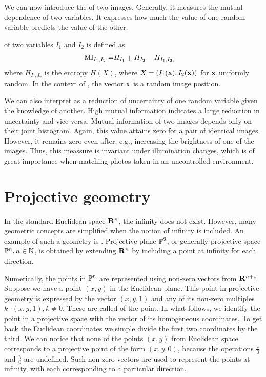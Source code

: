 We can now introduce the  of two images. 
Generally, it measures the mutual dependence of two variables. 
It expresses how much the value of one random variable predicts the value of the other.
\begin{definition}
 of two variables $I_1$ and $I_2$ is defined as
\begin{align*}
\MI{I_1, I_2} = & \H{I_1} + \H{I_2} - \H{I_1, I_2},
\end{align*}  
where $H_{I_1, I_2}$ is the entropy $H(X)$, where $X = (I_1(\x), I_2(\x))$ for $\x$ uniformly random. 
In the context of \cv, the vector $\x$ is a random image position. 
\end{definition}
We can also interpret  as a reduction of uncertainty of one random variable given the knowledge of another.
High mutual information indicates a large reduction in uncertainty and vice versa. 
Mutual information of two images depends only on their joint histogram. 
Again, this value attains zero for a pair of identical images. 
However, it remains zero even after, e.g., increasing the brightness of one of the images. 
Thus, this meassure is invariant under illumination changes, which is of great importance when matching photos taken in an uncontrolled environment. 

\section{Projective geometry}

In the standard Euclidean space $\R^n$, the infinity does not exist.
However, many geometric concepts are simplified when the notion of infinity is included.
An example of such a geometry is .
Projective plane $\P^2$, or generally projective space $\P^n, n \in \N$, is obtained by extending $\R^n$ by including a point at infinity for each direction.

Numerically, the points in $\P^n$ are represented using non-zero vectors from $\R^{n+1}$.
Suppose we have a point $(x, y)$ in the Euclidean plane.
This point in projective geometry is expressed by the vector $(x, y, 1)$ and any of its non-zero multiples $k \cdot (x, y, 1), k \neq 0$.
These are called  of the point.
In what follows, we identify the point in a projective space with the vector of its homogeneous coordinates. 
To get back the Euclidean coordinates we simple divide the first two coordinates by the third.
We can notice that none of the points $(x, y)$ from Euclidean space corresponds to a projective point of the form $(x, y, 0)$, because the operations $\frac{x}{0}$ and $\frac{y}{0}$ are undefined.
Such non-zero vectors are used to represent the points at infinity, with each corresponding to a particular direction. 

